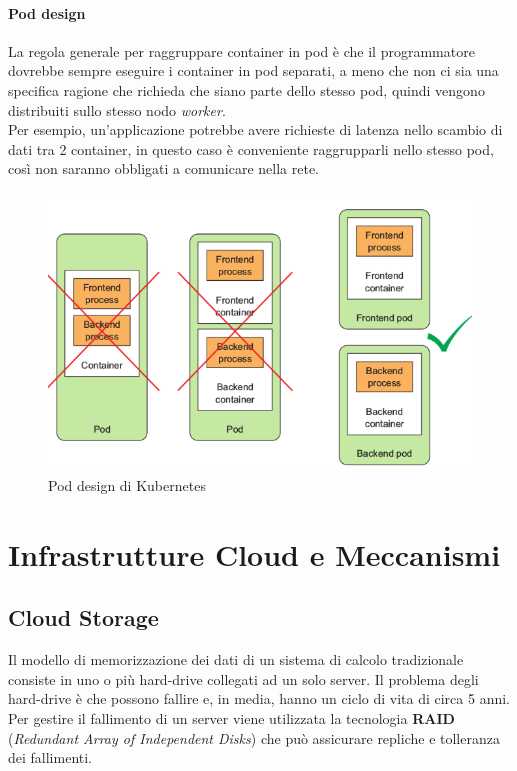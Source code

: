 \documentclass{article}
\begin{document}
\paragraph{Pod design}
La regola generale per raggruppare container in pod è che il programmatore dovrebbe sempre eseguire i container in pod separati, a meno che non ci sia una specifica ragione che richieda che siano parte dello stesso pod, quindi vengono distribuiti sullo stesso nodo \textit{worker}. \\
Per esempio, un'applicazione potrebbe avere richieste di latenza nello scambio di dati tra 2 container, in questo caso è conveniente raggrupparli nello stesso pod, così non saranno obbligati a comunicare nella rete.
\begin{figure}[H]
    \centering
    \includegraphics[scale=0.3]{img/Kubernetes pod design.png}
    \caption{Pod design di Kubernetes}
\end{figure}\noindent

\newpage
\section{Infrastrutture Cloud e Meccanismi}
\subsection{Cloud Storage}
Il modello di memorizzazione dei dati di un sistema di calcolo tradizionale consiste in uno o più hard-drive collegati ad un solo server. Il problema degli hard-drive è che possono fallire e, in media, hanno un ciclo di vita di circa 5 anni. Per gestire il fallimento di un server viene utilizzata la tecnologia \textbf{RAID} (\textit{Redundant Array of Independent Disks}) che può assicurare repliche e tolleranza dei fallimenti.
\end{document}

